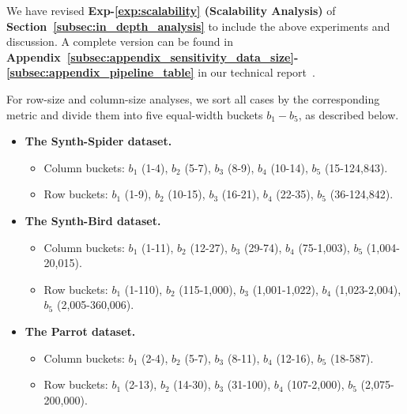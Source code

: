 We have revised \textbf{Exp-\ref{exp:scalability} (Scalability Analysis)} of \textbf{Section~\ref{subsec:in_depth_analysis}} to include the above experiments and discussion. A complete version can be found in \textbf{Appendix~\ref{subsec:appendix_sensitivity_data_size}-\ref{subsec:appendix_pipeline_table}} in our technical report~\cite{technical_report}.

For row-size and column-size analyses, we sort all cases by the corresponding metric and divide them into five equal-width buckets $b_1 - b_5$, as described below.
%
\begin{itemize}[leftmargin=*]
    \item \textbf{The Synth-Spider dataset.}
    \begin{itemize}
        \item Column buckets: $b_1$ (1-4), $b_2$ (5-7), $b_3$ (8-9), $b_4$ (10-14), $b_5$ (15-124,843).
        \item Row buckets: $b_1$ (1-9), $b_2$ (10-15), $b_3$ (16-21), $b_4$ (22-35), $b_5$ (36-124,842).
    \end{itemize}
    \item \textbf{The Synth-Bird dataset.}
    \begin{itemize}
        \item Column buckets: $b_1$ (1-11), $b_2$ (12-27), $b_3$ (29-74), $b_4$ (75-1,003), $b_5$ (1,004-20,015).
        \item Row buckets: $b_1$ (1-110), $b_2$ (115-1,000), $b_3$ (1,001-1,022), $b_4$ (1,023-2,004), $b_5$ (2,005-360,006).
    \end{itemize}
    \item \textbf{The Parrot dataset.}
    \begin{itemize}
        \item Column buckets: $b_1$ (2-4), $b_2$ (5-7), $b_3$ (8-11), $b_4$ (12-16), $b_5$ (18-587).
        \item Row buckets: $b_1$ (2-13), $b_2$ (14-30), $b_3$ (31-100), $b_4$ (107-2,000), $b_5$ (2,075-200,000).
    \end{itemize}
\end{itemize}


